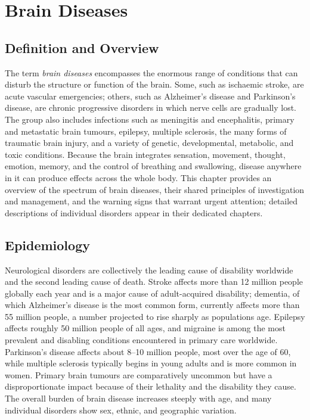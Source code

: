\chapter{Brain Diseases}

\section*{Definition and Overview}
The term \emph{brain diseases} encompasses the enormous range of conditions that can disturb the structure or function of the brain. Some, such as ischaemic stroke, are acute vascular emergencies; others, such as Alzheimer's disease and Parkinson's disease, are chronic progressive disorders in which nerve cells are gradually lost. The group also includes infections such as meningitis and encephalitis, primary and metastatic brain tumours, epilepsy, multiple sclerosis, the many forms of traumatic brain injury, and a variety of genetic, developmental, metabolic, and toxic conditions. Because the brain integrates sensation, movement, thought, emotion, memory, and the control of breathing and swallowing, disease anywhere in it can produce effects across the whole body. This chapter provides an overview of the spectrum of brain diseases, their shared principles of investigation and management, and the warning signs that warrant urgent attention; detailed descriptions of individual disorders appear in their dedicated chapters.

\section*{Epidemiology}
Neurological disorders are collectively the leading cause of disability worldwide and the second leading cause of death. Stroke affects more than 12 million people globally each year and is a major cause of adult-acquired disability; dementia, of which Alzheimer's disease is the most common form, currently affects more than 55 million people, a number projected to rise sharply as populations age. Epilepsy affects roughly 50 million people of all ages, and migraine is among the most prevalent and disabling conditions encountered in primary care worldwide. Parkinson's disease affects about 8--10 million people, most over the age of 60, while multiple sclerosis typically begins in young adults and is more common in women. Primary brain tumours are comparatively uncommon but have a disproportionate impact because of their lethality and the disability they cause. The overall burden of brain disease increases steeply with age, and many individual disorders show sex, ethnic, and geographic variation.

